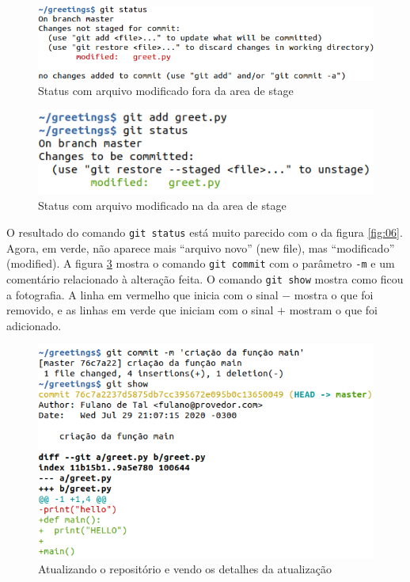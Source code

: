 \documentclass[a4paper]{book}
\begin{document}
\begin{figure}[ht]
\caption{Status com arquivo modificado fora da area de stage}
\label{fig:10}
\centering
\includegraphics[scale=0.6,left]{"images/10-Status com arquivo modificado fora da area de stage.png"}
\end{figure}


\begin{figure}[ht]
\caption{Status com arquivo modificado na da area de stage}
\label{fig:11}
\centering
\includegraphics[scale=0.6,left]{"images/11-Status com arquivo modificado na da area de stage.png"}
\end{figure}

O resultado do comando \texttt{git status} está muito parecido 
com o da figura \ref{fig:06}. Agora, em verde, não aparece
mais ``arquivo novo'' (new file), mas ``modificado'' (modified).
%
A figura \ref{fig:12} mostra o comando \texttt{git commit} com o
parâmetro \texttt{-m} e um comentário relacionado à alteração feita.
O comando \texttt{git show} mostra como ficou a fotografia.
A linha em vermelho que inicia com o sinal $-$ mostra
o que foi removido, e as linhas em verde que iniciam com
o sinal $+$ mostram o que foi adicionado.

\begin{figure}[ht]
\caption{Atualizando o repositório e vendo os detalhes da atualização}
\label{fig:12}
\centering
\includegraphics[scale=0.6,left]{"images/12-Atualizando o repositório e vendo os detalhes da atualização.png"}
\end{figure}
\end{document}

